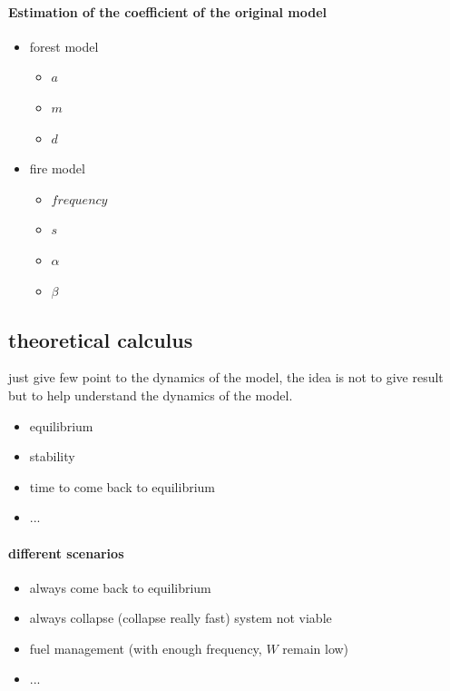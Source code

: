 \documentclass{article}
\begin{document}
\paragraph{Estimation of the coefficient of the original model}

\begin{itemize}
    \item forest model
    \begin{itemize}
        \item $a$ 
        \item $m$ 
        \item $d$
    \end{itemize}
    \item fire model
    \begin{itemize}
        \item $frequency$ 
        \item $s$
        \item $\alpha$
        \item $\beta$
    \end{itemize}
\end{itemize}



\subsection{theoretical calculus}

just give few point to the dynamics of the model, the idea is not to give result but to help understand the dynamics of the model.

\begin{itemize}
    \item equilibrium
    \item stability
    \item time to come back to equilibrium 
    \item ...
\end{itemize}


\paragraph{different scenarios} 
\begin{itemize}
    \item always come back to equilibrium
    \item always collapse (collapse really fast) system not viable
    \item fuel management (with enough frequency, $W$ remain low)
    \item ...
\end{itemize}
\end{document}
